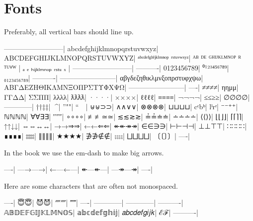 \hypertarget{Fonts}{%
\chapter{Fonts}\label{Fonts}}

\begin{fence}
\begin{code}%
\>[0]\AgdaSpace{}%
\AgdaSpace{}%
\<%
\end{code}
\end{fence}

Preferably, all vertical bars should line up.

\begin{myDisplay}
--------------------------|
abcdefghijklmnopqrstuvwxyz|
ABCDEFGHIJKLMNOPQRSTUVWXYZ|
ᵃᵇᶜᵈᵉᶠᵍʰⁱʲᵏˡᵐⁿᵒᵖ ʳˢᵗᵘᵛʷˣʸᶻ|
ᴬᴮ ᴰᴱ ᴳᴴᴵᴶᴷᴸᴹᴺᴼᴾ ᴿ ᵀᵁⱽᵂ   |
ₐ   ₑ  ₕᵢⱼₖₗₘₙₒₚ ᵣₛₜᵤ  ₓ  |
--------------------------|
----------|
0123456789|
⁰¹²³⁴⁵⁶⁷⁸⁹|
₀₁₂₃₄₅₆₇₈₉|
----------|
------------------------|
αβγδεζηθικλμνξοπρστυφχψω|
ΑΒΓΔΕΖΗΘΙΚΛΜΝΞΟΠΡΣΤΥΦΧΨΩ|
------------------------|
----|
≠≠≠≠|
ηημμ|
ΓΓΔΔ|
ΣΣΠΠ|
λλλλ|
ƛƛƛƛ|
····|
××××|
ℓℓℓℓ|
≡≡≡≡|
¬¬¬¬|
≤≤≥≥|
∅∅∅∅|
————|
††‡‡|
^^^^|
''""|
``~~|
⊎⊎⊃⊃|
∧∧∨∨|
⊗⊗⊗⊗|
⊔⊔⊔⊔|
cᶜbᵇ|
lˡrʳ|
⁻⁻⁺⁺|
ℕℕℕℕ|
∀∀∃∃|
′′″″|
∘∘∘∘|
‌≢≢≃≃|
≲≲≳≳|
≟≟≐≐|
∸∸∸∸|
⟨⟨⟩⟩|
⌊⌊⌋⌋|
⌈⌈⌉⌉|
↑↑↓↓|
⇔⇔↔↔|
→→⇒⇒|
←←⇐⇐|
↞↞↠↠|
∈∈∋∋|
⊢⊢⊣⊣|
⊥⊥⊤⊤|
∷∷∷∷|
∎∎∎∎|
⦂⦂⦂⦂|
∥∥∥∥|
★★★★|
∌∌∉∉|
⨟⨟⨟⨟|
⨆⨆⨆⨆|
〔〔〕〕|
----|
\end{myDisplay}

In the book we use the em-dash to make big arrows.

\begin{myDisplay}
----|
—→—→|
←—←—|
↞—↞—|
—↠—↠|
----|
\end{myDisplay}

Here are some characters that are often not monospaced.

\begin{myDisplay}
----|
😇😇|
😈😈|
⁗⁗|
‴‴|
----|
------------|
------------|
----------|
𝔸𝔹𝔻𝔼𝔽𝔾𝕀𝕁𝕂𝕃𝕄ℕ𝕆𝕊|
𝕒𝕓𝕔𝕕𝕖𝕗𝕘𝕙𝕚𝕛|
𝑎𝑏𝑐𝑑𝑒𝑓𝑔𝑖𝑗𝑘|
ℰℱ|
----------|
\end{myDisplay}

